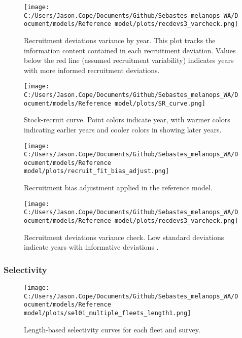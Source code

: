 \documentclass[11pt,
  english,
  letterpaper,
]{article}
\begin{document}
\pagebreak

\begin{figure}
\centering
\texttt{[image: C:/Users/Jason.Cope/Documents/Github/Sebastes\_melanops\_WA/Document/models/Reference model/plots/recdevs3\_varcheck.png]}
\caption{Recruitment deviations variance by year. This plot tracks the information content contained in each recruitment deviation. Values below the red line (assumed recruitment variability) indicates years with more informed recruitment deviations.\label{fig:rec-devs-sigmas}}
\end{figure}

\pagebreak

\begin{figure}
\centering
\texttt{[image: C:/Users/Jason.Cope/Documents/Github/Sebastes\_melanops\_WA/Document/models/Reference model/plots/SR\_curve.png]}
\caption{Stock-recruit curve. Point colors indicate year, with warmer colors indicating earlier years and cooler colors in showing later years.\label{fig:bh-curve}}
\end{figure}

\pagebreak

\begin{figure}
\centering
\texttt{[image: C:/Users/Jason.Cope/Documents/Github/Sebastes\_melanops\_WA/Document/models/Reference model/plots/recruit\_fit\_bias\_adjust.png]}
\caption{Recruitment bias adjustment applied in the reference model.\label{fig:bias-adj}}
\end{figure}

\begin{figure}
\centering
\texttt{[image: C:/Users/Jason.Cope/Documents/Github/Sebastes\_melanops\_WA/Document/models/Reference model/plots/recdevs3\_varcheck.png]}
\caption{Recruitment deviations variance check. Low standard deviations indicate years with informative deviations .\label{fig:varcheck}}
\end{figure}

\pagebreak

\hypertarget{selectivity}{%
\subsubsection{Selectivity}\label{selectivity}}

\begin{figure}
\centering
\texttt{[image: C:/Users/Jason.Cope/Documents/Github/Sebastes\_melanops\_WA/Document/models/Reference model/plots/sel01\_multiple\_fleets\_length1.png]}
\caption{Length-based selectivity curves for each fleet and survey.\label{fig:fleet_selectivity}}
\end{figure}
\end{document}

